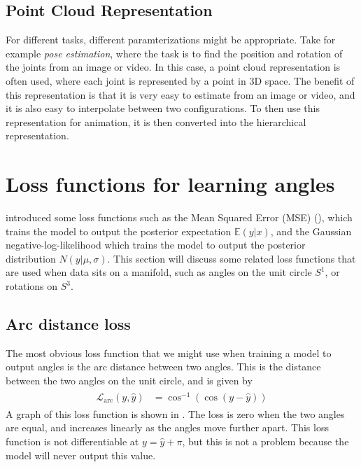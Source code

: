 \subsection{Point Cloud Representation}

For different tasks, different paramterizations might be appropriate. Take for example \textit{pose estimation}, where the task is to find the position and rotation of the joints from an image or video. In this case, a point cloud representation is often used, where each joint is represented by a point in 3D space. The benefit of this representation is that it is very easy to estimate from an image or video, and it is also easy to interpolate between two configurations. To then use this representation for animation, it is then converted into the hierarchical representation.


\section{Loss functions for learning angles}

 introduced some loss functions such as the Mean Squared Error (MSE) (), which trains the model to output the posterior expectation $\mathbb{E}(y | x)$, and the Gaussian negative-log-likelihood which trains the model to output the posterior distribution $N(y | \mu, \sigma)$. This section will discuss some related loss functions that are used when data sits on a manifold, such as angles on the unit circle $S^1$, or rotations on $S^3$.
\subsection{Arc distance loss}
\label{ss:arc-dist}

The most obvious loss function that we might use when training a model to output angles is the arc distance between two angles. This is the distance between the two angles on the unit circle, and is given by
\begin{align}
\label{eqn:arc-dist}
\begin{aligned}
    \mathcal{L}_{\text{arc}}(y, \hat{y}) &= \cos^{-1}(\cos(y - \hat{y}))
\end{aligned}
\end{align}
A graph of this loss function is shown in . The loss is zero when the two angles are equal, and increases linearly as the angles move further apart. This loss function is not differentiable at $y = \hat{y} + \pi$, but this is not a problem because the model will never output this value.


